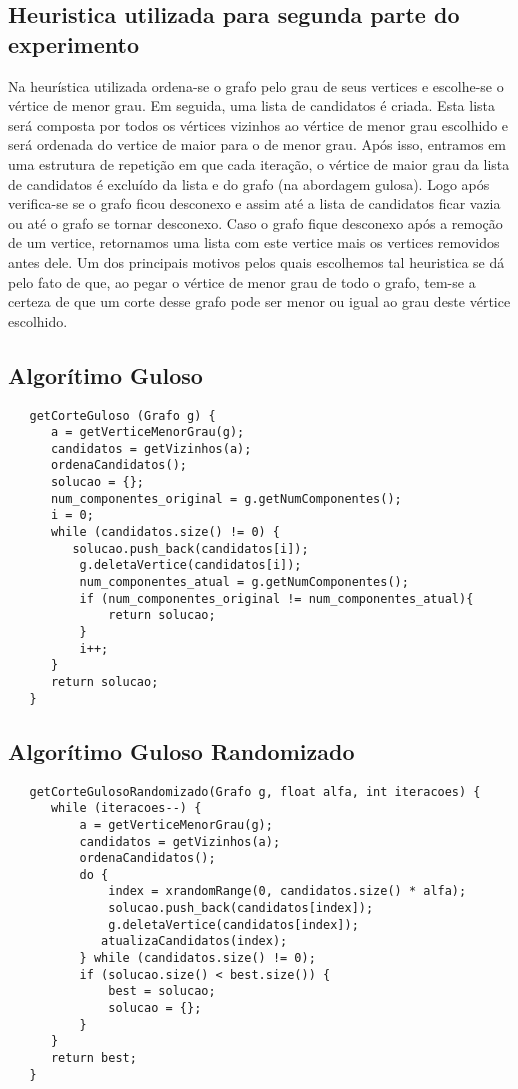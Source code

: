 \documentclass[a4paper, 12pt]{article}
\begin{document}
\subsection{Heuristica utilizada para segunda parte do experimento}
Na heurística utilizada ordena-se o grafo pelo grau de seus vertices e escolhe-se o vértice de menor grau. Em seguida, uma lista de candidatos é criada. Esta lista será composta por todos os vértices vizinhos ao vértice de menor grau escolhido e será ordenada do vertice de maior para o de menor grau. Após isso, entramos em uma estrutura de repetição em que cada iteração, o vértice de maior grau da lista de candidatos é excluído da lista e do grafo (na abordagem gulosa). Logo após verifica-se se o grafo ficou desconexo e assim até a lista de candidatos ficar vazia ou até o grafo se tornar desconexo. Caso o grafo fique desconexo após a remoção de um vertice, retornamos uma lista com este vertice mais os vertices removidos antes dele. Um dos principais motivos pelos quais escolhemos tal heuristica se dá pelo fato de que, ao pegar o vértice de menor grau de todo o grafo, tem-se a certeza de que um corte desse grafo pode ser menor ou igual ao grau deste vértice escolhido.

\subsection{Algorítimo Guloso}
 
 \begin{lstlisting} 
   getCorteGuloso (Grafo g) {
      a = getVerticeMenorGrau(g); 
      candidatos = getVizinhos(a); 
      ordenaCandidatos();
      solucao = {};
      num_componentes_original = g.getNumComponentes(); 
      i = 0;
      while (candidatos.size() != 0) {
         solucao.push_back(candidatos[i]);
          g.deletaVertice(candidatos[i]);
          num_componentes_atual = g.getNumComponentes(); 
          if (num_componentes_original != num_componentes_atual){
              return solucao;
          }
          i++;
      }
      return solucao;
   }
 \end{lstlisting}

\subsection{Algorítimo Guloso Randomizado}

\begin{lstlisting} 
   getCorteGulosoRandomizado(Grafo g, float alfa, int iteracoes) {
      while (iteracoes--) {
          a = getVerticeMenorGrau(g); 
          candidatos = getVizinhos(a); 
          ordenaCandidatos(); 
          do {
              index = xrandomRange(0, candidatos.size() * alfa);
              solucao.push_back(candidatos[index]);
              g.deletaVertice(candidatos[index]);
             atualizaCandidatos(index); 
          } while (candidatos.size() != 0);
          if (solucao.size() < best.size()) {
              best = solucao;
              solucao = {};
          }
      }
      return best;
   }
 \end{lstlisting}
\end{document}
